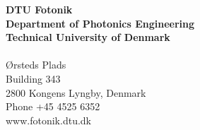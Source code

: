\thispagestyle{empty} %
\frieze
\vspace*{\fill}
\noindent
\sffamily
\small
\textbf{DTU Fotonik}\\
\textbf{Department of Photonics Engineering}\\
\textbf{Technical University of Denmark}\\
\\
Ørsteds Plads\\
Building 343\\
2800 Kongens Lyngby, Denmark\\
Phone +45 4525 6352\\
www.fotonik.dtu.dk\\
\normalsize
\normalfont
\vspace*{2.5cm}
